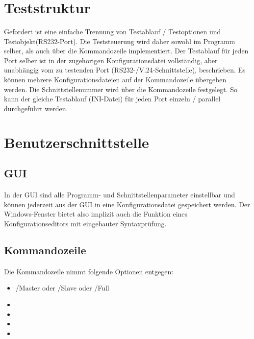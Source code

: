 \section{Teststruktur}
\paragraph{}
Gefordert ist eine einfache Trennung von Testablauf / Testoptionen  und  Testobjekt(RS232-Port). Die Teststeuerung wird daher sowohl im Programm selber, als auch über die Kommandozeile implementiert. Der Testablauf für jeden Port selber ist in der zugehörigen Konfigurationsdatei vollständig, aber unabhängig vom zu testenden Port (RS232-/V.24-Schnittstelle), beschrieben. Es können mehrere Konfigurationsdateien auf der Kommandozeile übergeben werden. Die Schnittstellenummer wird über die Kommandozeile festgelegt. So kann der gleiche Testablauf (INI-Datei) für jeden Port einzeln / parallel durchgeführt werden.


\section{Benutzerschnittstelle}

\subsection{GUI}
\paragraph{}
In der GUI sind alle Programm- und Schnittstellenparameter einstellbar und können jederzeit aus der GUI in eine Konfigurationsdatei gespeichert werden. Der Windows-Fenster bietet also implizit auch die Funktion eines Konfigurationseditors mit eingebauter Syntaxprüfung.


\subsection{Kommandozeile}
\paragraph{}
Die Kommandozeile nimmt folgende Optionen entgegen:
\begin{itemize}
\item /Master oder /Slave oder /Full
\item
\item
\item
\item
\end{itemize} 


